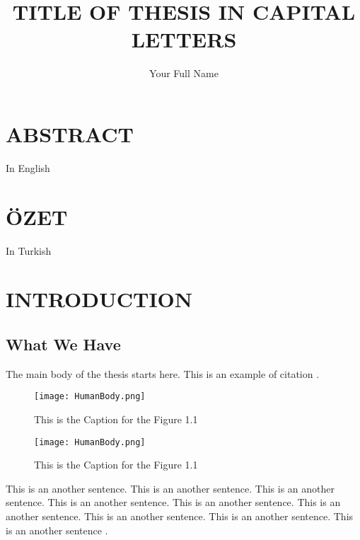 \documentclass[a4paper, 12pt]{report}
\title{TITLE OF THESIS IN CAPITAL LETTERS}
\author{Your Full Name}
\begin{document}
\makecstitle

\tableofcontents
\listoffigures
\listoftables

\begin{symabbreviations}


\sym{}{} 

\end{symabbreviations}

\chapter*{ABSTRACT}
In English

\chapter*{ÖZET}
In Turkish

\chapter{INTRODUCTION}

\section{What We Have}
The main body of the thesis starts here.
This is an example of citation \cite{label}.


\begin{figure}[!h]
\begin{center}
\texttt{[image: HumanBody.png]}
\caption{This is the Caption for the Figure 1.1}
\end{center}
\end{figure}


\begin{figure}[!h]
\begin{center}
\texttt{[image: HumanBody.png]}
\caption{This is the Caption for the Figure 1.1}
\end{center}
\end{figure}

This is an another sentence. This is an another sentence. This is an another sentence. This is an another sentence. 
This is an another sentence. This is an another sentence. This is an another sentence. This is an another sentence. 
This is an another sentence \cite{lee}.
\end{document}
